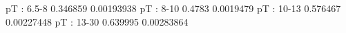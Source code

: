 pT : 6.5-8
0.346859 0.00193938
pT : 8-10
0.4783 0.0019479
pT : 10-13
0.576467 0.00227448
pT : 13-30
0.639995 0.00283864
